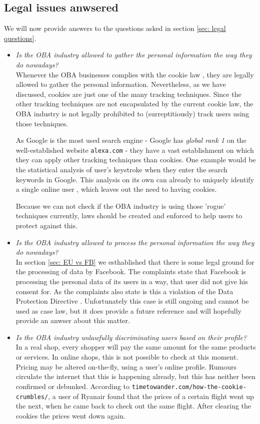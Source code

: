 \documentclass[11pt]{article}
\newcommand{\DPD}{Data Protection Directive }
\begin{document}
\subsection{Legal issues anwsered}
We will now provide answers to the questions asked in section \ref{sec: legal questions}.

\begin{itemize}
	\item \textit{Is the OBA industry allowed to gather the personal information the way they do nowadays?}\\
Whenever the OBA businesses complies with the cookie law \cite{cookielaw}, they are legally allowed to gather the personal information. Nevertheless, as we have discussed, cookies are just one of the many tracking techniques. Since the other tracking techniques are not encapsulated by the current cookie law, the OBA industry is not legally prohibited to (surreptitiously) track users using those techniques. 

As Google is the most used search engine - Google has \textit{global rank 1} \cite{googlerank1} on the well-established website \texttt{alexa.com} - they have a vast establishment on which they can apply other tracking techniques than cookies. One example would be the statistical analysis of user's keystroke when they enter the search keywords in Google. This analysis on its own can already to uniquely identify a single online user \cite{keystroke}, which leaves out the need to having cookies.

Because we can not check if the OBA industry is using those 'rogue' techniques currently, laws should be created and enforced to help users to protect against this.

	\item \textit{Is the OBA industry allowed to process the personal information the way they do nowadays?}\\
In section \ref{sec: EU vs FB} we esthablished that there is some legal ground for the processing of data by Facebook. The complaints state that Facebook is processing the personal data of its users in a way, that user did not give his consent for. As the complaints also state is this a violation of the \DPD. Unfortunately this case is still ongoing and cannot be used as case law, but it does provide a future reference and will hopefully provide an anwser about this matter.
			
	\item \textit{Is the OBA industry unlawfully discriminating users based on their profile?}\\
In a real shop, every shopper will pay the same amount for the same products or services. In online shops, this is not possible to check at this moment. Pricing may be altered on-the-fly, using a user's online profile. Rumours circulate the internet that this is happening already, but this has neither been confirmed or debunked. According to \texttt{timetowander.com/how-the-cookie-crumbles/}, a user of Ryanair found that the prices of a certain flight went up the next, when he came back to check out the same flight. After clearing the cookies the prices went down again. 


\end{itemize}
\end{document}
